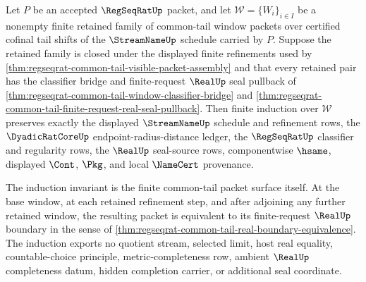 \begin{theorem}
\label{thm:regseqrat-common-tail-window-induction}
Let $P$ be an accepted $\RegSeqRatUp$ packet, and let $\mathcal W=\{W_i\}_{i \in I}$ be a nonempty finite retained family of common-tail window packets over certified cofinal tail shifts of the $\StreamNameUp$ schedule carried by $P$. Suppose the retained family is closed under the displayed finite refinements used by \autoref{thm:regseqrat-common-tail-visible-packet-assembly} and that every retained pair has the classifier bridge and finite-request $\RealUp$ seal pullback of \autoref{thm:regseqrat-common-tail-window-classifier-bridge} and \autoref{thm:regseqrat-common-tail-finite-request-real-seal-pullback}. Then finite induction over $\mathcal W$ preserves exactly the displayed $\StreamNameUp$ schedule and refinement rows, the $\DyadicRatCoreUp$ endpoint-radius-distance ledger, the $\RegSeqRatUp$ classifier and regularity rows, the $\RealUp$ seal-source rows, componentwise $\hsame$, displayed $\Cont$, $\Pkg$, and local $\NameCert$ provenance.

The induction invariant is the finite common-tail packet surface itself. At the base window, at each retained refinement step, and after adjoining any further retained window, the resulting packet is equivalent to its finite-request $\RealUp$ boundary in the sense of \autoref{thm:regseqrat-common-tail-real-boundary-equivalence}. The induction exports no quotient stream, selected limit, host real equality, countable-choice principle, metric-completeness row, ambient $\RealUp$ completeness datum, hidden completion carrier, or additional seal coordinate.
\end{theorem}
